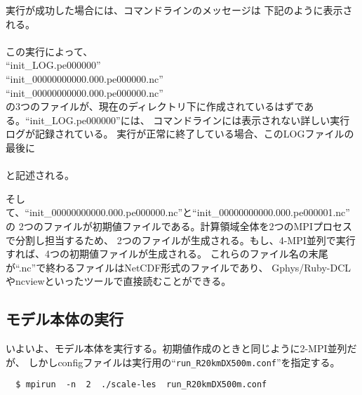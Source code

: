 \noindent 実行が成功した場合には、コマンドラインのメッセージは
下記のように表示される。\\
{\small {\gt
{}}}\\

\noindent この実行によって、\\
``init\_LOG.pe000000''\\
``init\_00000000000.000.pe000000.nc''\\
``init\_00000000000.000.pe000000.nc''\\
の3つのファイルが、現在のディレクトリ下に作成されているはずである。``init\_LOG.pe000000''には、
コマンドラインには表示されない詳しい実行ログが記録されている。
実行が正常に終了している場合、このLOGファイルの最後に\\

{\small {\gt
{}}}\\
\noindent と記述される。

そして、``init\_00000000000.000.pe000000.nc''と``init\_00000000000.000.pe000001.nc''の
2つのファイルが初期値ファイルである。計算領域全体を2つのMPIプロセスで分割し担当するため、
2つのファイルが生成される。もし、4-MPI並列で実行すれば、4つの初期値ファイルが生成される。
これらのファイル名の末尾が``.nc''で終わるファイルはNetCDF形式のファイルであり、
Gphys/Ruby-DCLやncviewといったツールで直接読むことができる。


\subsection{モデル本体の実行}
いよいよ、モデル本体を実行する。初期値作成のときと同じように2-MPI並列だが、
しかしconfigファイルは実行用の``\verb|run_R20kmDX500m.conf|''を指定する。
\begin{verbatim}
  $ mpirun  -n  2  ./scale-les  run_R20kmDX500m.conf
\end{verbatim}


